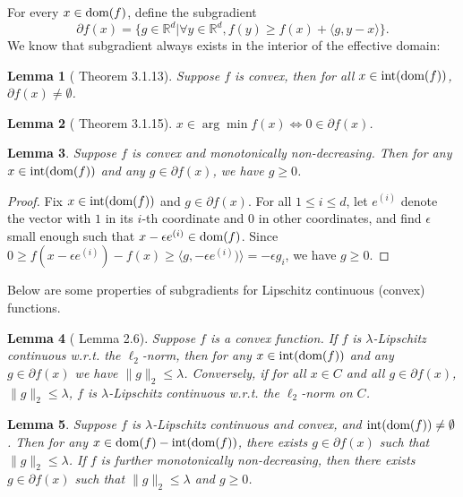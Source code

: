 \documentclass{article}
\def\int{\textup{int}}
\def\dom{\textup{dom}}
\newtheorem{lemma}{Lemma}
\begin{document}
For every $x\in\dom(f)$, define the subgradient
\begin{equation}\label{subgrad}
    \partial f(x) = \{g\in \mathbb{R}^d|\forall y\in \mathbb{R}^d,f(y)\ge f(x)+\langle g,y-x\rangle\}.
\end{equation}
We know that subgradient always exists in the interior of the effective domain:
\begin{lemma}[\cite{N13} Theorem 3.1.13]\label{subgradExists}
    Suppose $f$ is convex, then for all $x\in\int(\dom(f))$, $\partial f(x)\ne\emptyset$.
\end{lemma}
\begin{lemma}[\cite{N13} Theorem 3.1.15]
    $x\in\arg\min f(x)\iff0\in\partial f(x)$.
\end{lemma}
\begin{lemma}
    Suppose $f$ is convex and monotonically non-decreasing. Then for any $x\in\int(\dom(f))$ and any $g\in\partial f(x)$, we have $g\ge0$.
\end{lemma}
\begin{proof}
    Fix $x\in\int(\dom(f))$ and $g\in\partial f(x)$. For all $1\le i\le d$, let $e^{(i)}$ denote the vector with $1$ in its $i$-th coordinate and $0$ in other coordinates, and find $\epsilon$ small enough such that $x-\epsilon e^{(i)}\in\dom(f)$. Since $0\ge f(x-\epsilon e^{(i)})-f(x)\ge \langle g,-\epsilon e^{(i)})\rangle=-\epsilon g_i$, we have $g\ge0$.
\end{proof}
Below are some properties of subgradients for Lipschitz continuous (convex) functions.
\begin{lemma}[\cite{S11} Lemma 2.6]
    Suppose $f$ is a convex function. If $f$ is $\lambda$-Lipschitz continuous w.r.t. the $\ell_2$-norm, then for any $x\in \int(\dom(f))$ and any $g\in\partial f(x)$ we have $\|g\|_2\le\lambda$. Conversely, if for all $x\in C$ and all $g\in\partial f(x)$, $\|g\|_2\le\lambda$, $f$ is $\lambda$-Lipschitz continuous w.r.t. the $\ell_2$-norm on $C$.
\end{lemma}
\begin{lemma}\label{LipschConvBd}
    Suppose $f$ is $\lambda$-Lipschitz continuous and convex, and $\int(\dom(f))\ne\emptyset$. Then for any $x\in \dom(f)-\int(\dom(f))$, there exists $g\in\partial f(x)$ such that $\|g\|_2\le\lambda$. If $f$ is further monotonically non-decreasing, then there exists $g\in\partial f(x)$ such that $\|g\|_2\le\lambda$ and $g\ge 0$.
\end{lemma}
\end{document}
